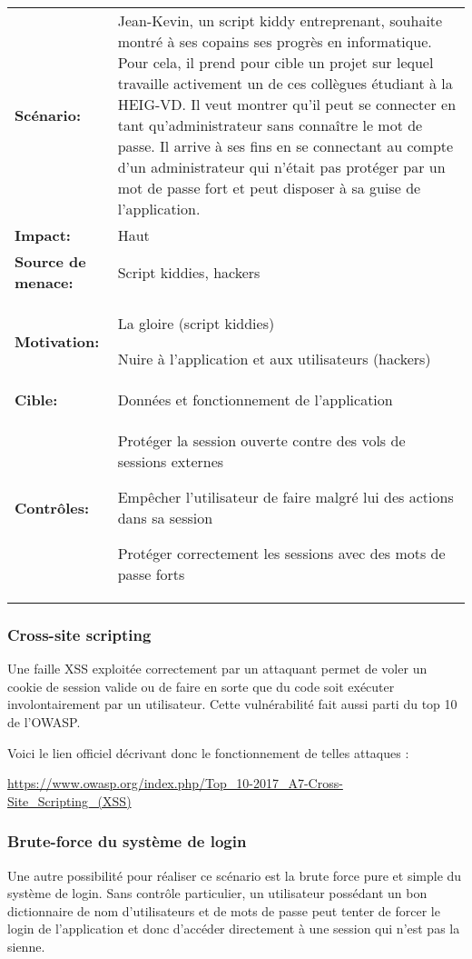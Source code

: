 \renewcommand{\arraystretch}{1.6}
\begin{tabular}{@{}p{4cm}p{12cm}}
\textbf{Scénario:} &  Jean-Kevin, un script kiddy entreprenant, souhaite montré à ses copains ses progrès en informatique. Pour cela, il prend pour cible un projet sur lequel travaille activement un de ces collègues étudiant à la HEIG-VD. Il veut montrer qu'il peut se connecter en tant qu'administrateur sans connaître le
mot de passe. Il arrive à ses fins en se connectant au compte d'un
administrateur qui n'était pas protéger par un mot de passe fort et
peut disposer à sa guise de l'application.\\
\textbf{Impact:} & Haut \\
\textbf{Source de menace: } & Script kiddies, hackers \\
\textbf{Motivation:} & La gloire (script kiddies)

Nuire à l'application et aux utilisateurs (hackers)\\
\textbf{Cible:} & Données et fonctionnement de l'application \\
\textbf{Contrôles:} & Protéger la session ouverte contre des vols de sessions externes

Empêcher l'utilisateur de faire malgré lui des actions dans sa session

Protéger correctement les sessions avec des mots de passe forts
\end{tabular}
\renewcommand{\arraystretch}{1}

\subsubsection{Cross-site scripting}

Une faille XSS exploitée correctement par un attaquant permet de voler un cookie de session valide ou de faire en sorte que du code soit exécuter involontairement par un utilisateur. Cette vulnérabilité fait aussi parti du top 10 de l'OWASP. 

Voici le lien officiel décrivant donc le fonctionnement de telles attaques : 

\url{https://www.owasp.org/index.php/Top_10-2017_A7-Cross-Site_Scripting_(XSS)}

\subsubsection{Brute-force du système de login}

Une autre possibilité pour réaliser ce scénario est la brute force pure et simple du système de login. Sans contrôle particulier, un utilisateur possédant un bon dictionnaire de nom d'utilisateurs et de mots de
passe peut tenter de forcer le login de l'application et donc d'accéder directement à une session qui n'est pas la sienne.

